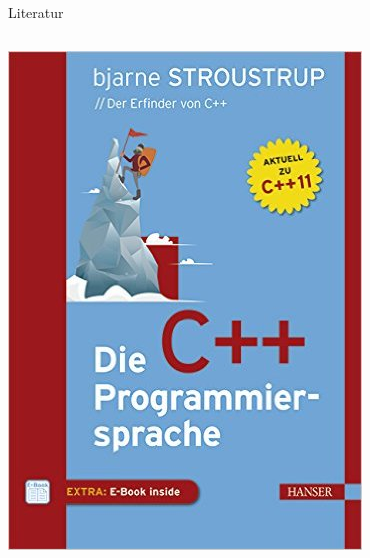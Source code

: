 \documentclass[presentation]{beamer}
\begin{document}
\begin{frame}[label={sec:orgf882c69}]{Literatur}
\begin{columns}
\begin{column}{0.5\columnwidth}
\begin{center}\begin{center}
\includegraphics[width=.9\linewidth]{stroustrup.jpg}
\end{center}\end{center}
\end{column}
\begin{column}{0.5\columnwidth}
\begin{center}\begin{center}

\end{center}
\end{center}
\end{column}
\end{columns}
\end{frame}
\end{document}
